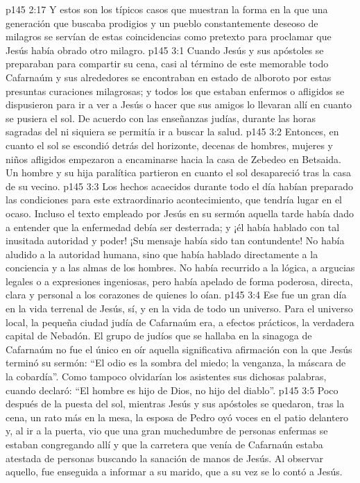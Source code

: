 \vs p145 2:17 \pc Y estos son los típicos casos que muestran la forma en la que una generación que buscaba prodigios y un pueblo constantemente deseoso de milagros se servían de estas coincidencias como pretexto para proclamar que Jesús había obrado otro milagro.
\vs p145 3:1 Cuando Jesús y sus apóstoles se preparaban para compartir su cena, casi al término de este memorable  todo Cafarnaúm y sus alrededores se encontraban en estado de alboroto por estas presuntas curaciones milagrosas; y todos los que estaban enfermos o afligidos se dispusieron para ir a ver a Jesús o hacer que sus amigos lo llevaran allí en cuanto se pusiera el sol. De acuerdo con las enseñanzas judías, durante las horas sagradas del  ni siquiera se permitía ir a buscar la salud.
\vs p145 3:2 Entonces, en cuanto el sol se escondió detrás del horizonte, decenas de hombres, mujeres y niños afligidos empezaron a encaminarse hacia la casa de Zebedeo en Betsaida. Un hombre y su hija paralítica partieron en cuanto el sol desapareció tras la casa de su vecino.
\vs p145 3:3 Los hechos acaecidos durante todo el día habían preparado las condiciones para este extraordinario acontecimiento, que tendría lugar en el ocaso. Incluso el texto empleado por Jesús en su sermón aquella tarde había dado a entender que la enfermedad debía ser desterrada; y ¡él había hablado con tal inusitada autoridad y poder! ¡Su mensaje había sido tan contundente! No había aludido a la autoridad humana, sino que había hablado directamente a la conciencia y a las almas de los hombres. No había recurrido a la lógica, a argucias legales o a expresiones ingeniosas, pero había apelado de forma poderosa, directa, clara y personal a los corazones de quienes lo oían.
\vs p145 3:4 \pc Ese  fue un gran día en la vida terrenal de Jesús, sí, y en la vida de todo un universo. Para el universo local, la pequeña ciudad judía de Cafarnaúm era, a efectos prácticos, la verdadera capital de Nebadón. El grupo de judíos que se hallaba en la sinagoga de Cafarnaúm no fue el único en oír aquella significativa afirmación con la que Jesús terminó su sermón: “El odio es la sombra del miedo; la venganza, la máscara de la cobardía”. Como tampoco olvidarían los asistentes sus dichosas palabras, cuando declaró: “El hombre es hijo de Dios, no hijo del diablo”.
\vs p145 3:5 \pc Poco después de la puesta del sol, mientras Jesús y sus apóstoles se quedaron, tras la cena, un rato más en la mesa, la esposa de Pedro oyó voces en el patio delantero y, al ir a la puerta, vio que una gran muchedumbre de personas enfermas se estaban congregando allí y que la carretera que venía de Cafarnaún estaba atestada de personas buscando la sanación de manos de Jesús. Al observar aquello, fue enseguida a informar a su marido, que a su vez se lo contó a Jesús.
